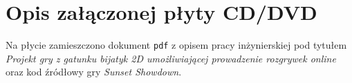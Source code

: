 \chapter{Opis załączonej płyty CD/DVD}
\label{chap:opis-plyty}
Na płycie zamieszczono dokument \texttt{pdf} z opisem pracy inżynierskiej pod tytułem \emph{Projekt gry z gatunku bijatyk 2D umożliwiającej prowadzenie rozgrywek online} oraz kod źródłowy gry \emph{Sunset Showdown}.